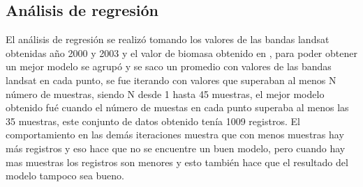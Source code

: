 \begin{table}
\caption{Datos obtenidos en en el proceso de procesamiento y limpieza  de datos}
\label{tab:datos}
\centering
{}
\end{table}

\subsection{Análisis de regresión}

El análisis de regresión se realizó tomando los valores de las bandas landsat obtenidas año 2000 y 2003 y el valor de biomasa obtenido en \cite{baccini2008afirst},
para poder obtener un mejor modelo se agrupó y se saco un promedio con valores de las bandas landsat en cada punto, se fue iterando con  valores que superaban al menos N número de
muestras, siendo N desde 1 hasta 45 muestras, el mejor modelo obtenido fué cuando el número de muestas en cada punto superaba al menos las 35 muestras, este conjunto
de datos obtenido tenía 1009 registros. El comportamiento en las demás iteraciones muestra que con menos muestras hay más registros y eso hace que no se encuentre un buen modelo,
pero cuando hay mas muestras los registros son menores y esto también hace que el resultado del modelo tampoco sea bueno.

